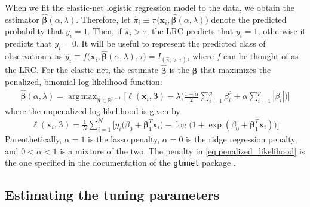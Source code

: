 \documentclass{article}
\DeclareMathOperator*{\argmax}{arg\,max}
\begin{document}
When we fit the elastic-net logistic regression model to the data, we obtain the estimator 
$\hat{\boldsymbol\beta}(\alpha,\lambda)$.  Therefore, 
let $\hat\pi_i \equiv \pi \bigl( \mathbf{x}_i,\hat{\boldsymbol\beta}(\alpha,\lambda) \bigr)$ denote the predicted probability 
that $y_i = 1$.  Then, if $\hat\pi_i > \tau$, the LRC predicts that $y_i = 1$, otherwise it predicts that $y_i = 0$.  
It will be useful to represent the predicted class of observation
$i$ as $\hat{y}_i \equiv f \bigl( \mathbf{x}_i,\hat{\boldsymbol{\beta}}(\alpha,\lambda),\tau \bigr) = 
I_{(\hat\pi_i > \tau)}$, where $f$ can be thought of as the LRC.
For the elastic-net, the estimate $\hat{\boldsymbol{\beta}}$ is the $\boldsymbol{\beta}$
that maximizes the penalized, binomial log-likelihood function:
\begin{align}
\label{eq:penalized_likelihood}
\hat{\boldsymbol{\beta}}(\alpha,\lambda) = \argmax_{\boldsymbol\beta \in \mathbb{R}^{p+1}} \Biggl[ \ell(\mathbf{x}_i,\boldsymbol{\beta}) - \lambda 
\biggl( \frac{1-\alpha}{2} \sum_{i=1}^p \beta_i^2 + \alpha \sum_{i=1}^p |\beta_i| \biggr) \Biggr]
\end{align}
\noindent where the unpenalized log-likelihood is given by
\begin{align}
\label{eq:unpenalized_likelihood}
\ell(\mathbf{x}_i,\boldsymbol{\beta}) = \frac{1}{N} \sum_{i=1}^N \biggl[ y_i \bigl( \beta_0 + \boldsymbol\beta_1^T\mathbf{x}_i \bigr) 
  - \log \bigl( 1 + \exp(\beta_0 + \boldsymbol\beta_1^T\mathbf{x}_i ) \bigl) \biggr]
\end{align}
\noindent Parenthetically, $\alpha = 1$ is the lasso penalty, $\alpha = 0$ is the ridge regression penalty,
and $0 < \alpha < 1$ is a mixture of the two. The penalty in \eqref{eq:penalized_likelihood} is the one 
specified in the documentation of the {\tt glmnet} package \cite{glmnet}.


\subsection{Estimating the tuning parameters}
\end{document}

